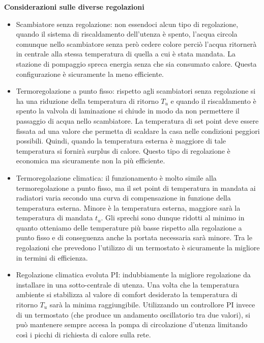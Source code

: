\documentclass[laurea,oneside,11pt]{USiena_tesiLM3}
\begin{document}
\textbf{Considerazioni sulle diverse regolazioni}
\begin{itemize}
\item Scambiatore senza regolazione: non essendoci alcun tipo di regolazione, quando il sistema di riscaldamento dell'utenza è spento, l'acqua circola comunque nello scambiatore senza però cedere colore perciò l'acqua ritornerà in centrale alla stessa temperatura di quella a cui è stata mandata. La stazione di pompaggio spreca energia senza che sia consumato calore. Questa configurazione è sicuramente la meno efficiente.
\item Termoregolazione a punto fisso: rispetto agli scambiatori senza regolazione si ha una riduzione della temperatura di ritorno $T_u$ e quando il riscaldamento è spento la valvola di laminazione si chiude in modo da non permettere il passaggio di acqua nello scambiatore. La temperatura di set point deve essere fissata ad una valore che permetta di scaldare la casa nelle condizioni peggiori possibili. Quindi, quando la temperatura esterna è maggiore di tale temperatura si fornirà surplus di  calore. Questo tipo di regolazione è economica ma sicuramente non la più efficiente.
\item Termoregolazione climatica: il funzionamento è molto simile alla termoregolazione a punto fisso, ma il set point di temperatura in mandata ai radiatori varia secondo una curva di compensazione in funzione della temperatura esterna. Minore è la temperatura esterna, maggiore sarà la temperatura di mandata $t_u$. Gli sprechi sono dunque ridotti al minimo in quanto otteniamo delle temperature più basse rispetto alla regolazione a punto fisso e di conseguenza anche la portata necessaria sarà minore. Tra le regolazioni che prevedono l'utilizzo di un termostato è sicuramente la migliore in termini di efficienza.
\item Regolazione climatica evoluta PI: indubbiamente la migliore regolazione da installare in una sotto-centrale di utenza. Una volta che la temperatura ambiente si stabilizza al valore di comfort desiderato la  temperatura di ritorno $T_u$ sarà la minima raggiungibile. Utilizzando un controllore PI invece di un termostato (che produce un andamento oscillatorio tra due valori), si può mantenere sempre accesa la pompa di circolazione d'utenza limitando così i picchi di richiesta di calore sulla rete.


\end{itemize}
\end{document}
